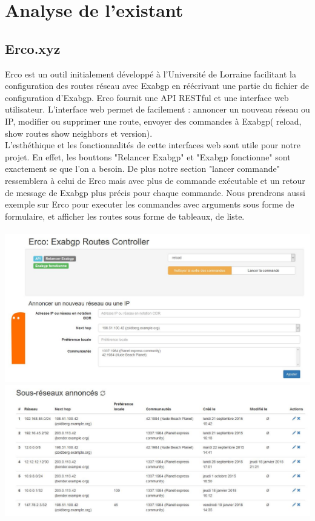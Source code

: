 \section{Analyse de l'existant}
\subsection{Erco.xyz \cite{Erco}}

Erco est un outil initialement développé à l'Université de Lorraine facilitant la configuration  des routes réseau avec Exabgp en réécrivant une partie du fichier de configuration d'Exabgp. Erco fournit une API RESTful et une interface web utilisateur. L'interface web permet de facilement : annoncer un nouveau réseau ou IP, modifier ou supprimer une route, envoyer des commandes à Exabgp( reload, show routes show neighbors et version).\\
L'esthéthique et les fonctionnalités de cette interfaces web sont utile pour notre projet. En effet, les bouttons "Relancer Exabgp" et "Exabgp fonctionne" sont exactement se que l'on a besoin. De plus notre section "lancer commande" ressemblera à celui de Erco mais avec plus de commande exécutable et un retour de message de Exabgp plus précis pour chaque commande. Nous prendrons aussi exemple sur Erco pour executer les commandes avec arguments sous forme de formulaire, et afficher les routes sous forme de tableaux, de liste. 
\\
\\
\includegraphics[scale = 0.5]{img/erco1.JPG}
\includegraphics[scale = 0.5]{img/erco2.JPG}

